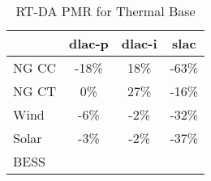 \begin{table}[htbp]
\centering
\begin{tabular}{lccc}
\toprule
\hline
 & dlac-p & dlac-i & slac \\
\hline
\quad NG CC & -18\% & 18\% & -63\% \\
\quad NG CT & 0\% & 27\% & -16\% \\
\quad Wind & -6\% & -2\% & -32\% \\
\quad Solar & -3\% & -2\% & -37\% \\
\quad BESS &  \\
\hline
\bottomrule
\end{tabular}
\caption{RT-DA PMR for Thermal Base}
\label{tab:table4_Thermal_Base}
\end{table}
